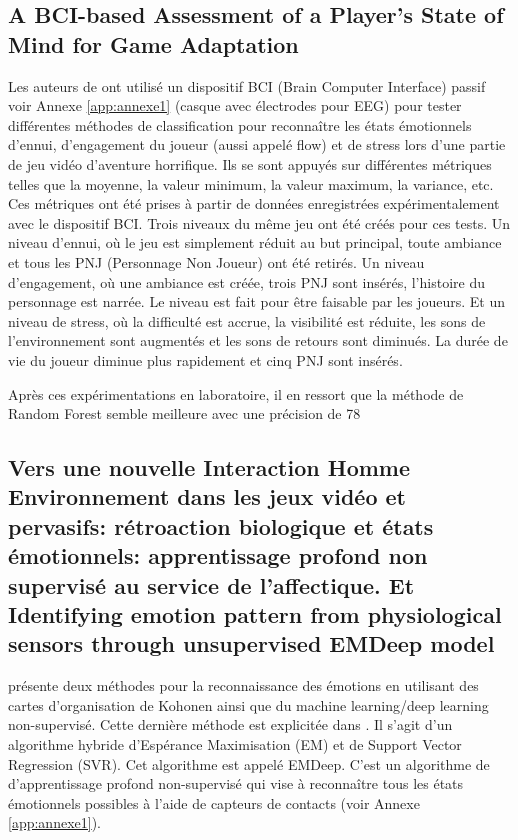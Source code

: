 \documentclass{article}
\begin{document}
    \subsection{A BCI-based Assessment of a Player’s State of Mind for Game Adaptation}
        Les auteurs de \cite{carofiglio_et_al._2019} ont utilisé un dispositif BCI (Brain Computer Interface) passif voir Annexe \ref{app:annexe1} (casque avec électrodes pour EEG) pour tester différentes méthodes de classification pour reconnaître les états émotionnels d’ennui, d’engagement du joueur (aussi appelé flow) et de stress lors d’une partie de jeu vidéo d’aventure horrifique. Ils se sont appuyés sur différentes métriques telles que la moyenne, la valeur minimum, la valeur maximum, la variance, etc. 
        Ces métriques ont été prises à partir de données enregistrées expérimentalement avec le dispositif BCI. Trois niveaux du même jeu ont été créés pour ces tests. 
        Un niveau d'ennui, où le jeu est simplement réduit au but principal, toute ambiance et tous les PNJ (Personnage Non Joueur) ont été retirés. 
        Un niveau d'engagement, où une ambiance est créée, trois PNJ sont insérés, l'histoire du personnage est narrée. Le niveau est fait pour être faisable par les joueurs. 
        Et un niveau de stress, où la difficulté est accrue, la visibilité est réduite, les sons de l'environnement sont augmentés et les sons de retours sont diminués. La durée de vie du joueur diminue plus rapidement et cinq PNJ sont insérés.\par
        Après ces expérimentations en laboratoire, il en ressort que la méthode de Random Forest semble meilleure avec une précision de 78%
    \subsection{Vers une nouvelle Interaction Homme Environnement dans les jeux vidéo et pervasifs: rétroaction biologique et états émotionnels: apprentissage profond non supervisé au service de l'affectique. Et Identifying emotion pattern from physiological sensors through unsupervised EMDeep model}
        \cite{gal_2019} présente deux méthodes pour la reconnaissance des émotions en utilisant des cartes d’organisation de Kohonen ainsi que du machine learning/deep learning non-supervisé. Cette dernière méthode est explicitée dans \cite{gal_et_al._2020}. 
        Il s’agit d’un algorithme hybride d’Espérance Maximisation (EM) et de Support Vector Regression (SVR).
        Cet algorithme est appelé EMDeep. 
        C'est un algorithme de d'apprentissage profond non-supervisé qui vise à reconnaître tous les états émotionnels possibles à l’aide de capteurs de contacts (voir Annexe \ref{app:annexe1}).
\end{document}
